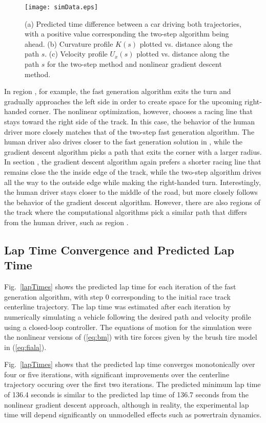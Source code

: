 \documentclass[twocolumn,10pt]{asme2ej}
\newcommand*\circled[1]{\tikz[baseline=(char.base)]{
            \node[shape=circle,draw,inner sep=2pt] (char) {#1};}}
\begin{document}
\begin{figure*}[tb]
\centering
\texttt{[image: simData.eps]}
\caption{(a) Predicted time difference between a car driving both trajectories, with a positive
value corresponding the two-step algorithm being ahead. (b) Curvature profile $K(s)$ plotted vs. distance along the path $s$.
 (c) Velocity profile $U_x(s)$ plotted 
vs. distance along the path $s$ for the two-step method and nonlinear gradient descent method.}
\label{fig:simData}
\end{figure*}

In region \circled{b}, for example, the fast generation algorithm exits the turn and gradually approaches the left side in order to create space for the
upcoming right-handed corner.  The nonlinear optimization, however, chooses a racing line that stays toward the right side of the track. In this case,
the behavior of the human driver more closely matches that of the two-step fast generation algorithm. The human driver also drives closer to the 
fast generation solution in \circled{h}, while the gradient descent algorithm picks a path that exits the corner with a larger radius. In section \circled{c}, the gradient descent
algorithm again prefers a shorter racing line that remains close the the inside edge of the track, while the two-step algorithm drives all the way
to the outside edge while making the right-handed turn. Interestingly, the human driver stays closer to the middle of the road, but more closely
follows the behavior of the gradient descent algorithm. However, there are also regions of the track where the computational algorithms pick a similar path that 
differs from the human driver, such as region \circled{d}.
 
 
\subsection{Lap Time Convergence and Predicted Lap Time}
Fig.~\ref{lapTimes} shows the predicted lap time for each iteration of the fast generation algorithm, with step 0 corresponding
to the initial race track centerline trajectory. The lap time was estimated after each iteration by numerically simulating a vehicle 
 following the desired path and velocity profile using a closed-loop controller. The equations of motion for the simulation
were the nonlinear versions of (\ref{eq:bm}) with tire forces given by
the brush tire model in (\ref{eq:fiala}). 

Fig.~\ref{lapTimes} shows that the predicted lap time converges monotonically over four or five iterations, with significant 
improvements over the centerline trajectory occuring over the first two iterations. The predicted minimum lap time of 136.4 seconds
is similar to the predicted lap time of 136.7 seconds from the nonlinear gradient descent approach, 
although in reality, the experimental lap time will depend significantly on unmodelled effects such 
as powertrain dynamics.  
\end{document}
